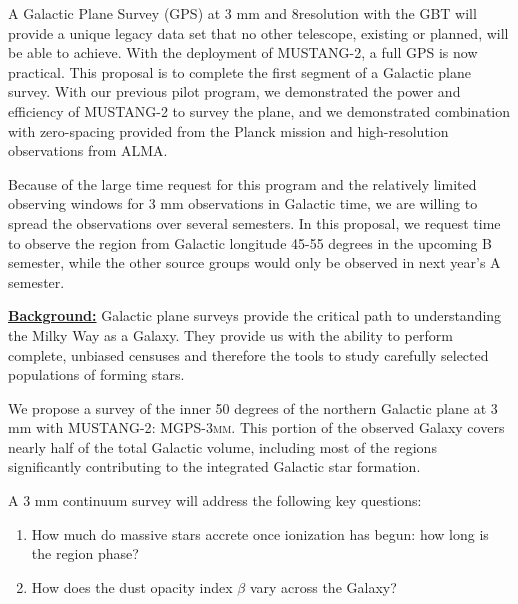 \documentclass[11pt,preprint]{aastex_nofoot}
\newcommand{\MUSTANG}{\textsc{MUSTANG-2}\xspace}
\newcommand{\MGPS}{\textsc{MGPS-3mm}\xspace}
\begin{document}


A Galactic Plane Survey (GPS) at 3 mm and 8\arcsec resolution with the GBT will provide a
unique legacy data set that no other telescope, existing or planned, will be
able to achieve.  With the deployment of \MUSTANG, a full GPS is now practical.  This
proposal is to complete the first segment of a Galactic plane survey.  With
our previous pilot program, we demonstrated the power and efficiency of \MUSTANG
to survey the plane, and we demonstrated combination with zero-spacing provided
from the Planck mission and high-resolution observations from ALMA.

Because of the large time request for this program and the relatively limited
observing windows for 3 mm observations in Galactic time, we are willing
to spread the observations over several semesters.  In this proposal,
we request time to observe the region from Galactic longitude 45-55
degrees in the upcoming B semester, while the other source groups
would only be observed in next year's A semester.

\underline{\bf Background:}
Galactic plane surveys provide the critical path to understanding the Milky Way
as a Galaxy.  They provide us with the ability to perform complete, unbiased
censuses and therefore the tools to study carefully selected populations of forming stars.

We propose a survey of the inner 50 degrees of the northern
Galactic plane at 3 mm with \MUSTANG: \MGPS.  This portion of the observed Galaxy covers
nearly half of the total Galactic volume, including most of the regions significantly
contributing to the integrated Galactic star formation.

A 3 mm continuum survey will address the following key questions:

\vspace{-2.5mm}

\begin{enumerate}

    \item How much do massive stars accrete once ionization has begun: how long
        is the \hchii region phase?
    \item How does the dust opacity index $\beta$  vary across the Galaxy?  

\end{enumerate}
\vspace{-2.5mm}
\end{document}
